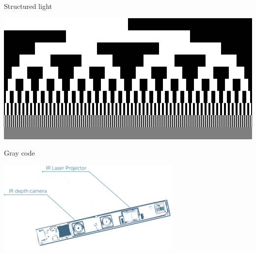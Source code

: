 \documentclass[compress]{beamer}
\begin{document}
{\begin{frame}{Structured light}
{\begin{multicols}{2}
                \includegraphics[width=0.8\columnwidth]{structured_light_gray_code}

                Gray code
                \vspace{1cm}

                \includegraphics[width=\linewidth]{f200_module_simple}
\end{multicols}
}
\end{frame}}
\end{document}
